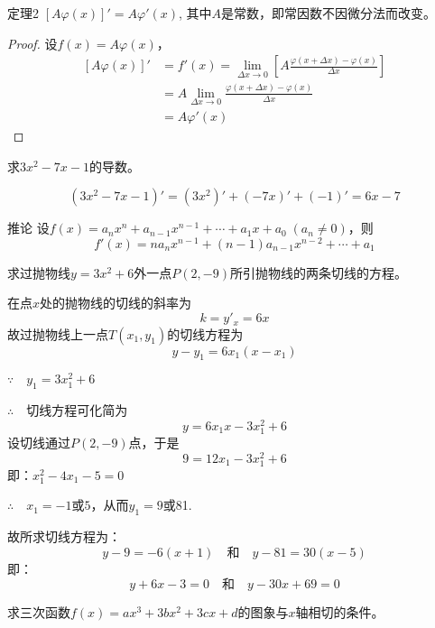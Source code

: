 \begin{blk}
{定理2} $[A\varphi (x)]'=A\varphi'(x)$, 其中$A$是常数，即常因数不因微分法而改变。    
\end{blk}

\begin{proof}
设$f(x)=A\varphi(x)$， 
\[\begin{split}
    [A\varphi(x)]'&=f'(x)=\lim_{\Delta x\to 0}\left[A\frac{\varphi(x+\Delta x)-\varphi(x)}{\Delta x}\right]\\
    &=A\lim_{\Delta x\to 0}\frac{\varphi(x+\Delta x)-\varphi(x)}{\Delta x}\\
    &=A\varphi'(x)
\end{split}\]
\end{proof}



\begin{example}
    求$3x^2-7x-1$的导数。
\end{example}

\begin{solution}
\[  (3x^2-7x-1)'=(3x^2)'+(-7x)'+(-1)'=6x-7\]
\end{solution}    

\begin{blk}{推论}
设$f(x)=a_nx^n+a_{n-1}x^{n-1}+\cdots+a_1x+a_0\; (a_n\ne 0)$，则
\[f'(x)=na_nx^{n-1}+(n-1)a_{n-1}x^{n-2}+\cdots+a_1\]
\end{blk}

\begin{example}
求过抛物线$y=3x^2+6$外一点$P(2,-9)$所引抛物线的两条切线的方程。
\end{example}

\begin{solution}
在点$x$处的抛物线的切线的斜率为
\[k=y'_x=6x\]
故过抛物线上一点$T(x_1,y_1)$的切线方程为
\[y-y_1=6x_1 (x-x_1)\] 

$\because\quad y_1=3x^2_1+6$

$\therefore\quad $切线方程可化简为
\[    y=6x_1x-3x_1^2+6\]
设切线通过$P(2,-9)$点，于是
\[9=12x_1-3x_1^2+6\]
即：$x_1^2-4x_1-5=0$

$\therefore\quad x_1=-1$或$5$，从而$y_1=9$或81.

故所求切线方程为：
\[y-9=-6(x+1)\quad\text{和}\quad y-81=30(x-5)\]
即：
\[y+6x-3=0\quad\text{和}\quad  y-30x+69=0\]
\end{solution}

\begin{example}
求三次函数$f(x)=ax^3+3bx^2+3cx+d$的图象与$x$轴相切的条件。
\end{example}

